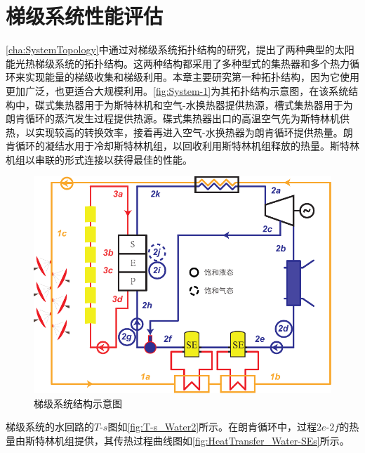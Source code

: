 \chapter{梯级系统性能评估}

\autoref{cha:SystemTopology}中通过对梯级系统拓扑结构的研究，提出了两种典型的太阳能光热梯级系统的拓扑结构。这两种结构都采用了多种型式的集热器和多个热力循环来实现能量的梯级收集和梯级利用。本章主要研究第一种拓扑结构，因为它使用更加广泛，也更适合大规模利用。\autoref{fig:System-1}为其拓扑结构示意图，在该系统结构中，碟式集热器用于为斯特林机和空气-水换热器提供热源，槽式集热器用于为朗肯循环的蒸汽发生过程提供热源。碟式集热器出口的高温空气先为斯特林机供热，以实现较高的转换效率，接着再进入空气-水换热器为朗肯循环提供热量。朗肯循环的凝结水用于冷却斯特林机组，以回收利用斯特林机组释放的热量。斯特林机组以串联的形式连接以获得最佳的性能。

\begin{figure}[htbp]
\centering
	\includegraphics[width = 0.8\columnwidth]{fig/cascadeSystem}
	\caption{梯级系统结构示意图}
	\label{fig:System-1}
\end{figure}

梯级系统的水回路的$T$-$s$图如\autoref{fig:T-s_Water2}所示。在朗肯循环中，过程$2e$-$2f$的热量由斯特林机组提供，其传热过程曲线图如\autoref{fig:HeatTransfer_Water-SEs}所示。

